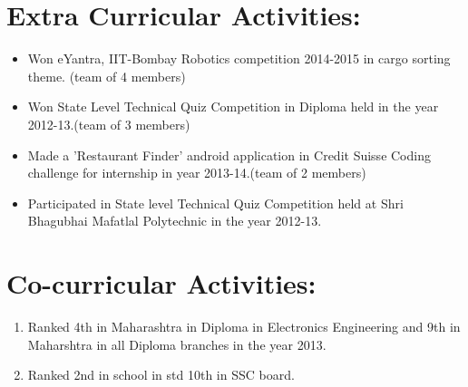 \documentclass[a4 paper,12pt]{article}
\begin{document}
\begin{minipage}{0.98\textwidth}
\section{Extra Curricular Activities:}
\begin{itemize}
	\vspace{-0.1in}
	\item Won eYantra, IIT-Bombay Robotics competition 2014-2015 in cargo sorting theme. (team of 4 members)
	\item Won State Level Technical Quiz Competition in Diploma held in the year 2012-13.(team of 3 members)
	\item Made a 'Restaurant Finder' android application in Credit Suisse Coding challenge for internship in year 2013-14.(team of 2 members)
	\item Participated in State level Technical Quiz Competition held at Shri Bhagubhai Mafatlal Polytechnic in the year 2012-13.
\end{itemize}

\section{Co-curricular Activities:}
\begin{enumerate}
	\vspace{-0.1in}
	\item Ranked 4th in Maharashtra in Diploma in Electronics Engineering and 9th in Maharshtra in all Diploma branches in the year 2013.
	\item Ranked 2nd in school in std 10th in SSC board.
\end{enumerate}
\end{minipage}
\end{document}
